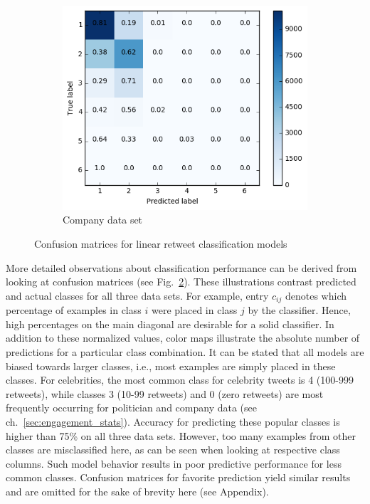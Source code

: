 \begin{figure}[h]
\begin{subfigure}{.5\textwidth}
  \centering
  \includegraphics[width=.95\linewidth]{img/corp_lin_cm_retweets}
  \caption{Company data set}
  \label{fig:retw_distr_sub3}
\end{subfigure}%
\caption{Confusion matrices for linear retweet classification models}
\label{fig:lin_cm}
\end{figure}

More detailed observations about classification performance can be derived from
looking at confusion matrices (see Fig.~\ref{fig:lin_cm}).
These illustrations contrast predicted and actual classes for all three data sets.
For example, entry $c_{ij}$ denotes which percentage of examples in class $i$
were placed in class $j$ by the classifier.
Hence, high percentages on the main diagonal are desirable for a solid classifier.
In addition to these normalized values, color maps illustrate the absolute
number of predictions for a particular class combination.
It can be stated that all models are biased towards larger classes, i.e.,
most examples are simply placed in these classes.
For celebrities, the most common class for celebrity tweets is 4 (100-999 retweets), while classes
3 (10-99 retweets) and 0 (zero retweets) are most frequently occurring for politician and company data
(see ch.~\ref{sec:engagement_stats}).
Accuracy for predicting these popular classes is higher than 75\% on all three data sets.
However, too many examples from other classes are misclassified here, as can be
seen when looking at respective class columns.
Such model behavior results in poor predictive performance for less common classes.
Confusion matrices for favorite prediction yield similar results and are
omitted for the sake of brevity here (see Appendix).

